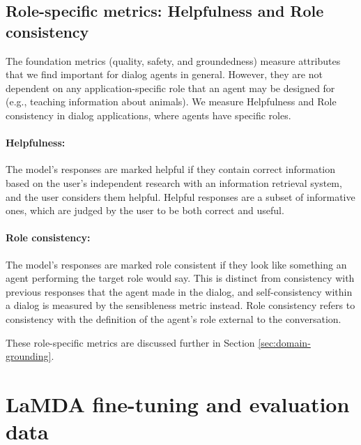 \documentclass{article}
\def\knowledgetool{information retrieval system\xspace}
\begin{document}
\subsection{Role-specific metrics: Helpfulness and Role consistency}
\label{sec:metrics-role}

The foundation metrics (quality, safety, and groundedness) measure attributes that we find important for dialog agents in general. However, they are not dependent on any application-specific role that an agent may be designed for (e.g., teaching information about animals). We measure Helpfulness and Role consistency in dialog applications, where agents have specific roles.

\paragraph{Helpfulness:} The model’s responses are marked helpful if they contain correct information based on the user’s independent research with an \knowledgetool, and the user considers them helpful. Helpful responses are a subset of informative ones, which are judged by the user to be both correct and useful.

\paragraph{Role consistency:} The model’s responses are marked role consistent if they look like something an agent performing the target role would say. This is distinct from consistency with previous responses that the agent made in the dialog, and self-consistency within a dialog is measured by the sensibleness metric instead. Role consistency refers to consistency with the definition of the agent’s role external to the conversation.

These role-specific metrics are discussed further in Section \ref{sec:domain-grounding}.

\section{LaMDA fine-tuning and evaluation data}
\label{sec:data}
\end{document}

